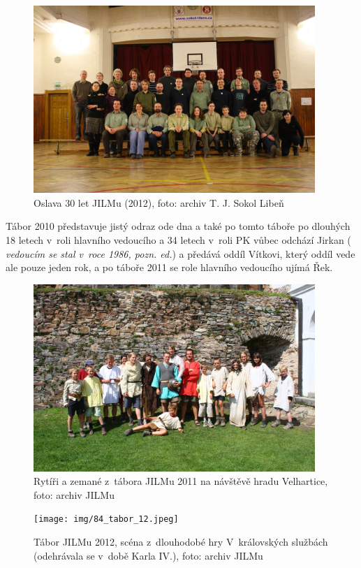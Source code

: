 \documentclass[a5paper, 11pt, twoside]{article}
\newcommand{\pozned}[1]{%
\textit{#1}}
\begin{document}
\begin{figure}[h]
  \centering 
  \includegraphics[width=0.95\textwidth]{img/82_jilm_30.JPG}
  \caption*{Oslava 30 let JILMu (2012), foto: archiv T. J. Sokol Libeň}
\end{figure}

Tábor 2010 představuje jistý odraz ode dna a také po tomto táboře po
dlouhých 18 letech v~roli hlavního vedoucího a 34 letech v~roli PK vůbec
odchází Jirkan (\pozned{vedoucím se stal v~roce 1986, pozn. ed.}) a předává oddíl
Vítkovi, který oddíl vede ale pouze jeden rok, a po táboře 2011 se role
hlavního vedoucího ujímá Řek.

\begin{figure}[h!]
  \centering 
  \includegraphics[width=0.95\textwidth]{img/83_tabor_11.jpg}
  \caption*{Rytíři a zemané z~tábora JILMu 2011 na návštěvě hradu Velhartice,
  foto: archiv JILMu}
\end{figure}

\begin{figure}[h!]
  \centering 
  \texttt{[image: img/84\_tabor\_12.jpeg]}
  \caption*{Tábor JILMu 2012, scéna z~dlouhodobé hry V~královských službách
  (odehrávala se v~době Karla IV.), foto: archiv JILMu}
\end{figure}
\end{document}
